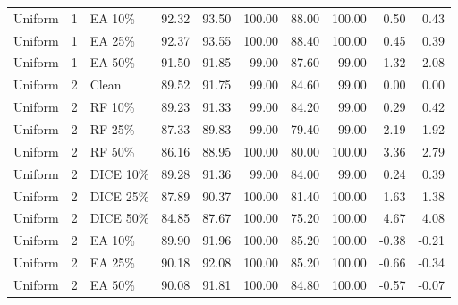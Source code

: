 {\begin{longtable}{rllrrrrrrr}
Uniform & 1 & EA 10\% & 92.32 & 93.50 & 100.00 & 88.00 & 100.00 & 0.50 & 0.43 \\
Uniform & 1 & EA 25\% & 92.37 & 93.55 & 100.00 & 88.40 & 100.00 & 0.45 & 0.39 \\
Uniform & 1 & EA 50\% & 91.50 & 91.85 & 99.00 & 87.60 & 99.00 & 1.32 & 2.08 \\
Uniform & 2 & Clean & 89.52 & 91.75 & 99.00 & 84.60 & 99.00 & 0.00 & 0.00 \\
Uniform & 2 & RF 10\% & 89.23 & 91.33 & 99.00 & 84.20 & 99.00 & 0.29 & 0.42 \\
Uniform & 2 & RF 25\% & 87.33 & 89.83 & 99.00 & 79.40 & 99.00 & 2.19 & 1.92 \\
Uniform & 2 & RF 50\% & 86.16 & 88.95 & 100.00 & 80.00 & 100.00 & 3.36 & 2.79 \\
Uniform & 2 & DICE 10\% & 89.28 & 91.36 & 99.00 & 84.00 & 99.00 & 0.24 & 0.39 \\
Uniform & 2 & DICE 25\% & 87.89 & 90.37 & 100.00 & 81.40 & 100.00 & 1.63 & 1.38 \\
Uniform & 2 & DICE 50\% & 84.85 & 87.67 & 100.00 & 75.20 & 100.00 & 4.67 & 4.08 \\
Uniform & 2 & EA 10\% & 89.90 & 91.96 & 100.00 & 85.20 & 100.00 & -0.38 & -0.21 \\
Uniform & 2 & EA 25\% & 90.18 & 92.08 & 100.00 & 85.20 & 100.00 & -0.66 & -0.34 \\
Uniform & 2 & EA 50\% & 90.08 & 91.81 & 100.00 & 84.80 & 100.00 & -0.57 & -0.07 \\
\end{longtable}
}

